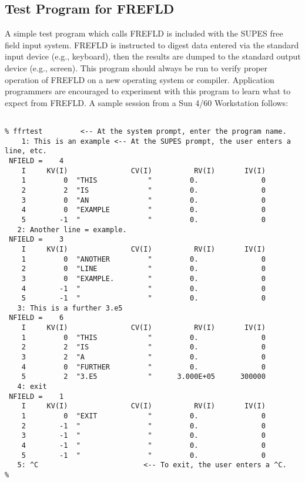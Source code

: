 \subsection{Test Program for FREFLD}
A simple test program which calls FREFLD is included with the SUPES free
field input system.  FREFLD is instructed to digest data entered via the
standard input device (e.g., keyboard), then the results are dumped to the
standard output device (e.g., screen).  This program should always be run to
verify proper operation of FREFLD on a new operating system or compiler.
Application programmers are encouraged to experiment with this program to
learn what to expect from FREFLD.
A sample session from a Sun 4/60 Workstation follows:
\begin{verbatim}

% ffrtest         <-- At the system prompt, enter the program name.
    1: This is an example <-- At the SUPES prompt, the user enters a line, etc.
 NFIELD =    4
    I     KV(I)               CV(I)          RV(I)       IV(I)
    1         0  "THIS            "         0.               0
    2         2  "IS              "         0.               0
    3         0  "AN              "         0.               0
    4         0  "EXAMPLE         "         0.               0
    5        -1  "                "         0.               0
   2: Another line = example.
 NFIELD =    3
    I     KV(I)               CV(I)          RV(I)       IV(I)
    1         0  "ANOTHER         "         0.               0
    2         0  "LINE            "         0.               0
    3         0  "EXAMPLE.        "         0.               0
    4        -1  "                "         0.               0
    5        -1  "                "         0.               0
   3: This is a further 3.e5
 NFIELD =    6
    I     KV(I)               CV(I)          RV(I)       IV(I)
    1         0  "THIS            "         0.               0
    2         2  "IS              "         0.               0
    3         2  "A               "         0.               0
    4         0  "FURTHER         "         0.               0
    5         2  "3.E5            "      3.000E+05      300000
   4: exit
 NFIELD =    1
    I     KV(I)               CV(I)          RV(I)       IV(I)
    1         0  "EXIT            "         0.               0
    2        -1  "                "         0.               0
    3        -1  "                "         0.               0
    4        -1  "                "         0.               0
    5        -1  "                "         0.               0
   5: ^C                         <-- To exit, the user enters a ^C.
%
\end{verbatim}

